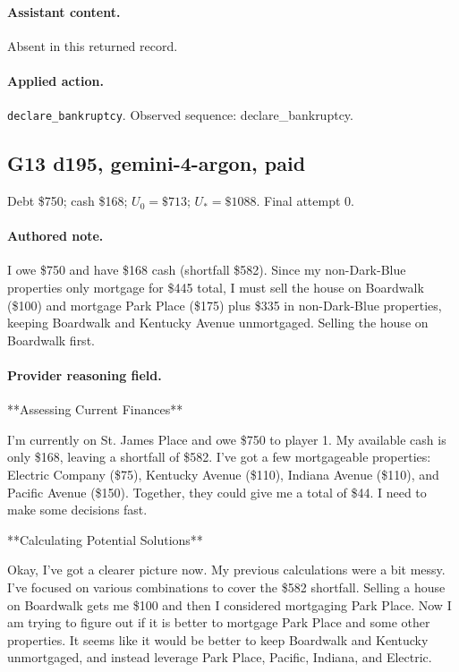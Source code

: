 \paragraph{Assistant content.} Absent in this returned record.

\paragraph{Applied action.} \texttt{declare\_bankruptcy}. Observed sequence: declare\_bankruptcy.

\subsection*{G13 d195, gemini-4-argon, paid}

\noindent Debt \$750; cash \$168; $U_0=\$713$; $U_*=\$1088$. Final attempt 0.\par

\paragraph{Authored note.} I owe \$750 and have \$168 cash (shortfall \$582). Since my non-Dark-Blue properties only mortgage for \$445 total, I must sell the house on Boardwalk (\$100) and mortgage Park Place (\$175) plus \$335 in non-Dark-Blue properties, keeping Boardwalk and Kentucky Avenue unmortgaged. Selling the house on Boardwalk first.

\paragraph{Provider reasoning field.} **Assessing Current Finances**

I'm currently on St. James Place and owe \$750 to player 1. My available cash is only \$168, leaving a shortfall of \$582. I've got a few mortgageable properties: Electric Company (\$75), Kentucky Avenue (\$110), Indiana Avenue (\$110), and Pacific Avenue (\$150). Together, they could give me a total of \$44. I need to make some decisions fast.


**Calculating Potential Solutions**

Okay, I've got a clearer picture now. My previous calculations were a bit messy. I've focused on various combinations to cover the \$582 shortfall. Selling a house on Boardwalk gets me \$100 and then I considered mortgaging Park Place. Now I am trying to figure out if it is better to mortgage Park Place and some other properties. It seems like it would be better to keep Boardwalk and Kentucky unmortgaged, and instead leverage Park Place, Pacific, Indiana, and Electric.


